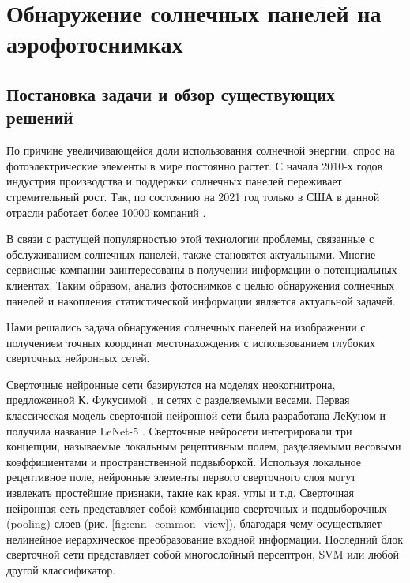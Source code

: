 
\section{Обнаружение солнечных панелей на аэрофотоснимках}

\subsection{Постановка задачи и обзор существующих решений}
По причине увеличивающейся доли использования солнечной энергии, спрос на фотоэлектрические элементы в мире постоянно растет. С начала 2010-х годов индустрия производства и поддержки солнечных панелей переживает стремительный рост. Так, по состоянию на 2021 год только в США в данной отрасли работает более 10000 компаний \cite{seia}.

В связи с растущей популярностью этой технологии проблемы, связанные с обслуживанием солнечных панелей, также становятся актуальными. Многие сервисные компании заинтересованы в получении информации о потенциальных клиентах. Таким образом, анализ фотоснимков с целью обнаружения солнечных панелей и накопления статистической информации является актуальной задачей.


Нами решались задача обнаружения солнечных панелей на изображении с получением точных координат местонахождения с использованием глубоких сверточных нейронных сетей.

Сверточные нейронные сети базируются на моделях неокогнитрона, предложенной К. Фукусимой \cite{fukushima1980}, и сетях с разделяемыми весами. Первая классическая модель сверточной нейронной сети была разработана ЛеКуном и получила название LeNet-5 \cite{lekun1998}. Сверточные нейросети интегрировали три концепции, называемые локальным рецептивным полем, разделяемыми весовыми коэффициентами и пространственной подвыборкой. Используя локальное рецептивное поле, нейронные элементы первого сверточного слоя могут извлекать простейшие признаки, такие как края, углы и т.д. Сверточная нейронная сеть представляет собой комбинацию сверточных и подвыборочных (pooling) слоев (рис. \ref{fig:cnn_common_view}), благодаря чему осуществляет нелинейное иерархическое преобразование входной информации. Последний блок сверточной сети представляет собой многослойный персептрон, SVM или любой другой классификатор.

